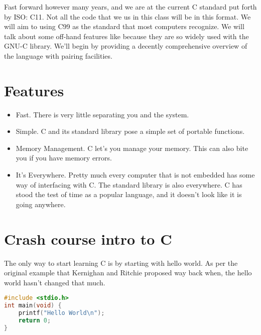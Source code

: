 Fast forward however many years, and we are at the current C standard put forth by ISO: C11.
Not all the code that we us in this class will be in this format.
We will aim to using C99 as the standard that most computers recognize.
We will talk about some off-hand features like  because they are so widely used with the GNU-C library.
We'll begin by providing a decently comprehensive overview of the language with pairing facilities.

\section{Features}

\begin{itemize}
	\item Fast. There is very little separating you and the system.
	\item Simple.
    C and its standard library pose a simple set of portable functions.
	\item Memory Management.
    C let's you manage your memory.
    This can also bite you if you have memory errors.
	\item It's Everywhere.
    Pretty much every computer that is not embedded has some way of interfacing with C.
    The standard library is also everywhere.
    C has stood the test of time as a popular language, and it doesn't look like it is going anywhere.
\end{itemize}

\section{Crash course intro to C}

The only way to start learning C is by starting with hello world. As per the original example that Kernighan and Ritchie proposed way back when, the hello world hasn't changed that much.

\begin{lstlisting}[language=C]
#include <stdio.h>
int main(void) {
    printf("Hello World\n");
    return 0;
}
\end{lstlisting}

